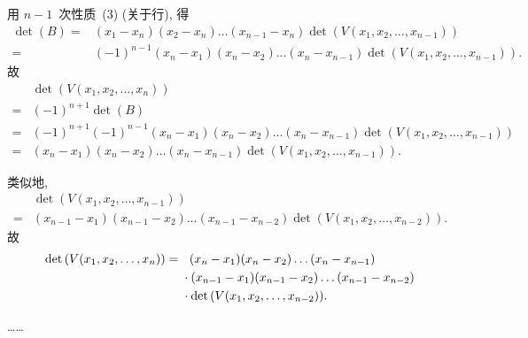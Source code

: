 \documentclass[../libro.tex]{subfiles}
\begin{document}
\begin{example}
    用 \(n-1\)~次性质~(3) (关于行), 得
    \begin{align*}
        \det {(B)}
        = {} &
        (x_1 - x_n) (x_2- x_n) \dots (x_{n-1} - x_n)
        \det {(V(x_1, x_2, \dots, x_{n-1}))}
        \\
        = {} &
        (-1)^{n-1} (x_n - x_1) (x_n - x_2) \dots (x_n - x_{n-1})
        \det {(V(x_1, x_2, \dots, x_{n-1}))}.
    \end{align*}
    故
    \begin{align*}
        &
        \det {(V(x_1, x_2, \dots, x_n))}
        \\
        = {} &
        (-1)^{n+1} \det {(B)}
        \\
        = {} &
        (-1)^{n+1}
        (-1)^{n-1} (x_n - x_1) (x_n - x_2) \dots (x_n - x_{n-1})
        \det {(V(x_1, x_2, \dots, x_{n-1}))}
        \\
        = {} &
        (x_n - x_1) (x_n - x_2) \dots (x_n - x_{n-1})
        \det {(V(x_1, x_2, \dots, x_{n-1}))}.
    \end{align*}

    类似地,
    \begin{align*}
        &
        \det {(V(x_1, x_2, \dots, x_{n-1}))}
        \\
        = {} &
        (x_{n-1} - x_1) (x_{n-1} - x_2) \dots (x_{n-1} - x_{n-2})
        \det {(V(x_1, x_2, \dots, x_{n-2}))}.
    \end{align*}
    故
    \begin{align*}
        \det {(V(x_1, x_2, \dots, x_n))}
        = {} & \hphantom{\cdot\,\,}
        (x_n - x_1) (x_n - x_2) \dots (x_n - x_{n-1})
        \\
        & \cdot
        (x_{n-1} - x_1) (x_{n-1} - x_2) \dots (x_{n-1} - x_{n-2})
        \\
        & \cdot
        \det {(V(x_1, x_2, \dots, x_{n-2}))}.
    \end{align*}

    ……


\end{example}
\end{document}
